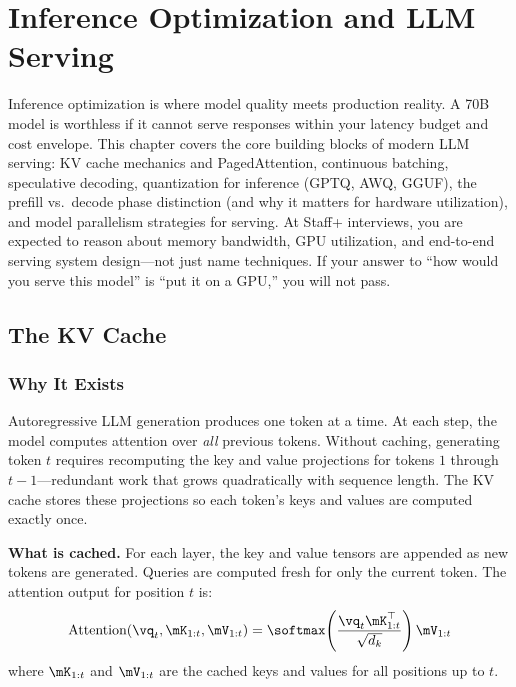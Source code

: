 \chapter{Inference Optimization and LLM Serving}
\label{chap:inference_optimization}

\begin{tldr}
Inference optimization is where model quality meets production reality. A 70B model is worthless if it cannot serve responses within your latency budget and cost envelope. This chapter covers the core building blocks of modern LLM serving: KV cache mechanics and PagedAttention, continuous batching, speculative decoding, quantization for inference (GPTQ, AWQ, GGUF), the prefill vs.\ decode phase distinction (and why it matters for hardware utilization), and model parallelism strategies for serving. At Staff+ interviews, you are expected to reason about memory bandwidth, GPU utilization, and end-to-end serving system design---not just name techniques. If your answer to ``how would you serve this model'' is ``put it on a GPU,'' you will not pass.
\end{tldr}

\section{The KV Cache}
\label{sec:kv_cache}

\subsection{Why It Exists}

Autoregressive LLM generation produces one token at a time. At each step, the model computes attention over \textit{all} previous tokens. Without caching, generating token $t$ requires recomputing the key and value projections for tokens $1$ through $t-1$---redundant work that grows quadratically with sequence length. The KV cache stores these projections so each token's keys and values are computed exactly once.

\textbf{What is cached.} For each layer, the key and value tensors are appended as new tokens are generated. Queries are computed fresh for only the current token. The attention output for position $t$ is:
\[
\text{Attention}(\vq_t, \mK_{1:t}, \mV_{1:t}) = \softmax\!\left(\frac{\vq_t \mK_{1:t}^\top}{\sqrt{d_k}}\right) \mV_{1:t}
\]
where $\mK_{1:t}$ and $\mV_{1:t}$ are the cached keys and values for all positions up to $t$.

